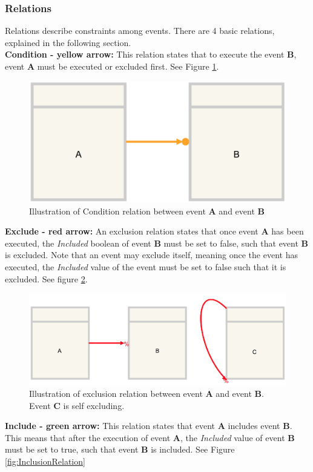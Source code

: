 \subsubsection{Relations}
Relations describe constraints among events. There are 4 basic relations, explained in the following section. \\

\textbf{Condition - yellow arrow:} This relation states that to execute the event \textbf{B}, event \textbf{A} must be executed or excluded first. See Figure \ref{fig:ConditionRelation}.

\begin{figure}[h!]
\centering
\includegraphics[width=0.5\linewidth]{Figures/conditions}
\caption{\label{fig:ConditionRelation} Illustration of Condition relation between event \textbf{A} and event \textbf{B}}
\end{figure} 

\textbf{Exclude - red arrow:} An exclusion relation states that once event \textbf{A} has been executed, the \textit{Included} boolean of event \textbf{B} must be set to false, such that event \textbf{B} is excluded. Note that an event may exclude itself, meaning once the event has executed, the \textit{Included} value of the event must be set to false such that it is excluded.  See figure \ref{fig:ExclusionRelation}.

\begin{figure}[h!]
\centering
\includegraphics[width=0.8\linewidth]{Figures/exclusion}
\caption{\label{fig:ExclusionRelation} Illustration of exclusion relation between event \textbf{A} and event \textbf{B}. Event \textbf{C} is self excluding.}
\end{figure} 


\textbf{Include - green arrow:} This relation states that event \textbf{A} includes event \textbf{B}. This means that  after the execution of event \textbf{A}, the \textit{Included} value of event \textbf{B} must be set to true, such that event \textbf{B} is included. See Figure \ref{fig:InclusionRelation}


